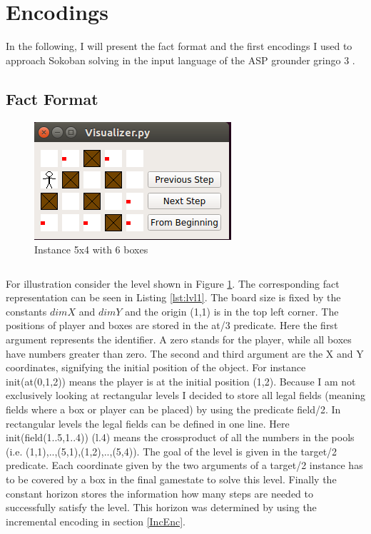 \documentclass{report}
\begin{document}
\section{Encodings}
In the following, I will present the fact format and the first encodings I used to approach Sokoban solving in the input language of the ASP grounder gringo 3 \cite{Potassco}.
\subsection{Fact Format}
\begin{figure}[ht]
\centering
\includegraphics{Visualizer}
\caption{Instance 5x4 with 6 boxes}
\label{fig:levelVis}
\end{figure}

\begin{lstlisting}[caption={Fact Format of my third level},label=lst:lvl1]
\end{lstlisting}
For illustration consider the level shown in Figure \ref{fig:levelVis}. The corresponding fact representation can be seen in Listing \ref{lst:lvl1}. The board size is fixed by the constants $dimX$ and $dimY$ and the origin (1,1) is in the top left corner. The positions of player and boxes are stored in the at/3 predicate. Here the first argument represents the identifier. A zero stands for the player, while all boxes have numbers greater than zero. The second and third argument are the X and Y coordinates, signifying the initial position of the object. For instance init(at(0,1,2)) means the player is at the initial position (1,2). Because I am not exclusively looking at rectangular levels I decided to store all legal fields (meaning fields where a box or player can be placed) by using the predicate field/2. In rectangular levels the legal fields can be defined in one line. Here init(field(1..5,1..4)) (l.4) means the crossproduct of all the numbers in the pools (i.e. (1,1),..,(5,1),(1,2),..,(5,4)).
The goal of the level is given in the target/2 predicate. Each coordinate given by the two arguments of a target/2 instance has to be covered by a box in the final gamestate to solve this level.
Finally the constant horizon stores the information how many steps are needed to successfully satisfy the level. This horizon was determined by using the incremental encoding in section \ref{IncEnc}.
\end{document}
